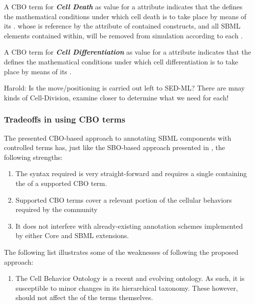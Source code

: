 A CBO term for \textbf{\textit{Cell Death}} as value for a  attribute indicates that the \Event defines the mathematical conditions under which cell death is to take place by means of its \Trigger. \Compartments whose  is reference by the  attribute of contained \EventAssignment constructs, and all SBML elements contained within, will be removed from simulation according to each \EventAssignment.

A CBO term for \textbf{\textit{Cell Differentiation}} as value for a  attribute indicates that the \Event defines the mathematical conditions under which cell differentiation is to take place by means of its \Trigger.

{\color{red} Harold: \notice  Is the move/positioning is carried out left to SED-ML? There are mnay kinds of Cell-Division, examine closer to determine what we need for each!}


\subsubsection{Tradeoffs in using CBO terms}
\label{subsec:tradeoffCBO}

The presented CBO-based approach to annotating SBML \Event components with controlled terms has, just like the SBO-based approach presented in \sbmlthreecore, the following strengths:

\begin{enumerate}
	\item The syntax required is very straight-forward and requires a single  containing the  of a supported CBO term.
	\item Supported CBO terms cover a relevant portion of the cellular behaviors required by the community
	\item It does not interfere with already-existing annotation schemes implemented by either Core and SBML extensions.
\end{enumerate}

The following list illustrates some of the weaknesses of following the proposed approach:

\begin{enumerate}
	\item The Cell Behavior Ontology is a recent and evolving ontology. As such, it is susceptible to minor changes in its hierarchical taxonomy. These however, should not affect the  of the terms themselves.
\end{enumerate}

